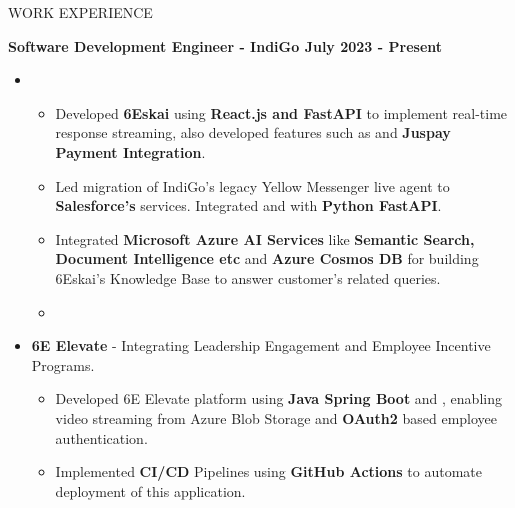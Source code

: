\documentclass{resume} %
\begin{document}
\begin{rSection}{WORK EXPERIENCE}

{\bf Software Development Engineer - IndiGo  \hfill July 2023 - Present }
\begin{itemize}
\item{}
\begin{itemize}
    \item {\normalfont Developed \textbf{6Eskai} using \textbf{React.js and FastAPI} to implement real-time response streaming, also developed features such as  and \textbf{Juspay Payment Integration}.}
    \item {\normalfont Led migration of IndiGo's legacy Yellow Messenger live agent to \textbf{Salesforce's} services. Integrated  and  with \textbf{Python FastAPI}.}
    \item {\normalfont Integrated \textbf{Microsoft Azure AI Services} like \textbf{Semantic Search, Document Intelligence etc} and \textbf{Azure Cosmos DB} for building 6Eskai's Knowledge Base to answer customer's related queries.}
    \item{  }
\end{itemize}


\end{itemize}
\begin{itemize}
    \item {\normalfont \textbf{6E Elevate} - Integrating Leadership Engagement and Employee Incentive Programs.}
    \begin{itemize}
        \item {\normalfont Developed 6E Elevate platform using \textbf{Java Spring Boot} and , enabling video streaming from Azure Blob Storage and \textbf{OAuth2} based employee authentication.}
        \item {\normalfont Implemented \textbf{CI/CD} Pipelines using \textbf{GitHub Actions} to automate deployment of this application.}
    \end{itemize}
\end{itemize}


\end{rSection}
\end{document}
